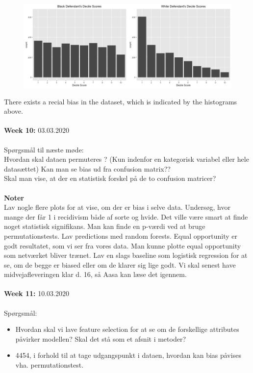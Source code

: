 \documentclass[11pt, fleqn]{article}
\begin{document}
	\begin{figure}[H]
		\centering
		\includegraphics[width=0.7\linewidth]{billeder/black_white}
	\end{figure}
	\noindent
	There exists a recial bias in the dataset, which is indicated by the histograms above. 
	\\\\
	\textbf{Week 10:}  03.03.2020 \\\\
	\noindent
	Spørgsmål til næste møde: \\
	Hvordan skal dataen permuteres ? (Kun indenfor en kategorisk variabel eller hele datasættet) \newline 
	Kan man se bias ud fra confusion matrix?? \\ 
	Skal man vise, at der en statistisk forskel på de to confusion matricer? \\ \\
	\textbf{Noter} \\ 
	Lav nogle flere plots for at vise, om der er bias i selve data. Undersøg, hvor mange der får 1 i recidivism både af sorte og hvide.
	\newline
	Det ville være smart at finde noget statistisk signifikans. Man kan finde en p-værdi ved at bruge permutationstests.
	\newline
	Lav predictions med random forests.
	\newline
	Equal opportunity er godt resultatet, som vi ser fra vores data. Man kunne plotte equal opportunity som netværket bliver trænet.
	\newline
	Lav en slags baseline som logistisk regression for at se, om de begge er biased eller om de klarer sig lige godt.
	\newline
	Vi skal senest have midvejafleveringen klar d. 16, så Aasa kan læse det igennem.	
	\\\\	
	\textbf{Week 11:}  10.03.2020 \\\\
	\noindent
	Spørgsmål:
	\begin{itemize}
		\item  Hvordan skal vi lave feature selection for at se om de forskellige attributes påvirker modellen? Skal det stå som et afsnit i metoder?
		
		\item 4454, i forhold til at tage udgangspunkt i dataen, hvordan kan bias påvises vha. permutationstest. 
		
	\end{itemize}
	
\end{document}
